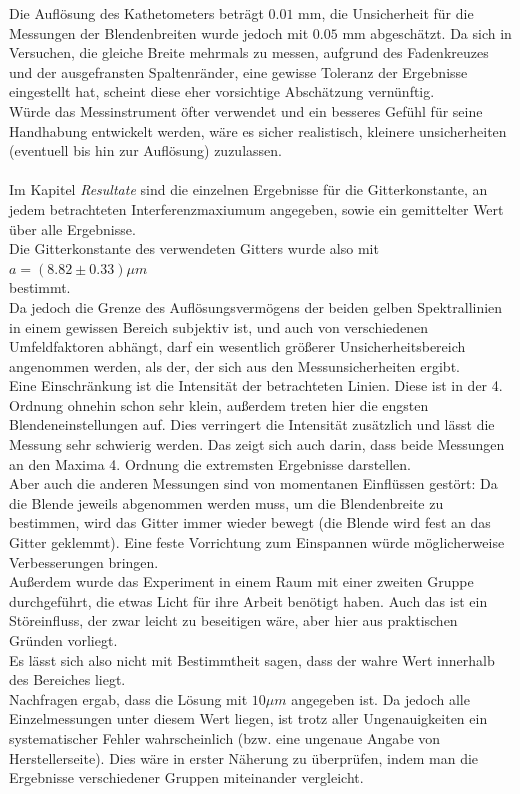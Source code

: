 \documentclass[12pt,a4paper]{article}
\begin{document}
\begin{multicols}{2}
Die Auflösung des Kathetometers beträgt $0.01$ mm, die Unsicherheit für die Messungen der Blendenbreiten wurde jedoch mit $0.05$ mm abgeschätzt. Da sich in Versuchen, die gleiche Breite mehrmals zu messen, aufgrund des Fadenkreuzes und der ausgefransten Spaltenränder, eine gewisse Toleranz der Ergebnisse eingestellt hat, scheint diese eher vorsichtige Abschätzung vernünftig.\\
Würde das Messinstrument öfter verwendet und ein besseres Gefühl für seine Handhabung entwickelt werden, wäre es sicher realistisch, kleinere unsicherheiten (eventuell bis hin zur Auflösung) zuzulassen.\\
\\
Im Kapitel \emph{Resultate} sind die einzelnen Ergebnisse für die Gitterkonstante, an jedem betrachteten Interferenzmaxiumum angegeben, sowie ein gemittelter Wert über alle Ergebnisse.\\
Die Gitterkonstante des verwendeten Gitters wurde also mit \\
$a=(8.82 \pm 0.33)\mu m$\\
bestimmt.\\
Da jedoch die Grenze des Auflösungsvermögens der beiden gelben Spektrallinien in einem gewissen Bereich subjektiv ist, und auch von verschiedenen Umfeldfaktoren abhängt, darf ein wesentlich größerer Unsicherheitsbereich angenommen werden, als der, der sich aus den Messunsicherheiten ergibt.\\
Eine Einschränkung ist die Intensität der betrachteten Linien. Diese ist in der 4. Ordnung ohnehin schon sehr klein, außerdem treten hier die engsten Blendeneinstellungen auf. Dies verringert die Intensität zusätzlich und lässt die Messung sehr schwierig werden. Das zeigt sich auch darin, dass beide Messungen an den Maxima 4. Ordnung die extremsten Ergebnisse darstellen.\\
Aber auch die anderen Messungen sind von momentanen Einflüssen gestört: Da die Blende jeweils abgenommen werden muss, um die Blendenbreite zu bestimmen, wird das Gitter immer wieder bewegt (die Blende wird fest an das Gitter geklemmt). Eine feste Vorrichtung zum Einspannen würde möglicherweise Verbesserungen bringen.\\
Außerdem wurde das Experiment in einem Raum mit einer zweiten Gruppe durchgeführt, die etwas Licht für ihre Arbeit benötigt haben. Auch das ist ein Störeinfluss, der zwar leicht zu beseitigen wäre, aber hier aus praktischen Gründen vorliegt.\\
Es lässt sich also nicht mit Bestimmtheit sagen, dass der wahre Wert innerhalb des Bereiches liegt.\\Nachfragen ergab, dass die Lösung mit $10 \mu m$ angegeben ist. Da jedoch alle Einzelmessungen unter diesem Wert liegen, ist trotz aller Ungenauigkeiten ein systematischer Fehler wahrscheinlich (bzw. eine ungenaue Angabe von Herstellerseite). Dies wäre in erster Näherung zu überprüfen, indem man die Ergebnisse verschiedener Gruppen miteinander vergleicht.\\

\end{multicols}
\end{document}
